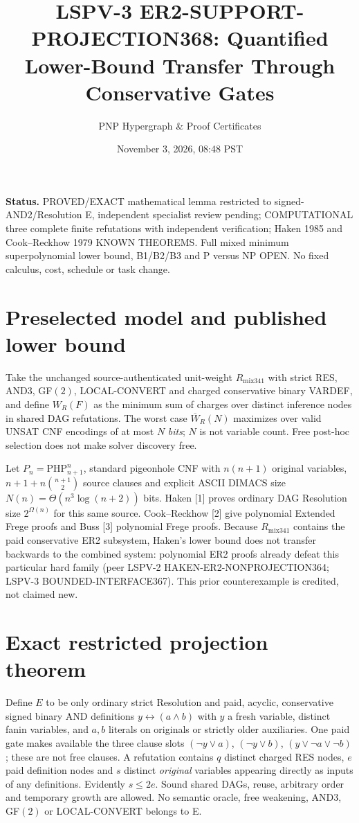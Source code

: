 \documentclass[11pt]{article}
\title{LSPV-3 ER2-SUPPORT-PROJECTION368: Quantified Lower-Bound Transfer Through Conservative Gates}
\author{PNP Hypergraph \& Proof Certificates}
\date{November 3, 2026, 08:48 PST}
\begin{document}
\maketitle
\noindent\textbf{Status.} PROVED/EXACT mathematical lemma restricted to signed-AND2/Resolution E, independent specialist review pending; COMPUTATIONAL three complete finite refutations with independent verification; Haken 1985 and Cook--Reckhow 1979 KNOWN THEOREMS. Full mixed minimum superpolynomial lower bound, B1/B2/B3 and P versus NP OPEN. No fixed calculus, cost, schedule or task change.

\section*{Preselected model and published lower bound}
Take the unchanged source-authenticated unit-weight $R_{\mathrm{mix341}}$ with strict RES, AND3, GF$(2)$, LOCAL-CONVERT and charged conservative binary VARDEF, and define $W_R(F)$ as the minimum sum of charges over distinct inference nodes in shared DAG refutations. The worst case $\overline W_R(N)$ maximizes over valid UNSAT CNF encodings of at most $N$ \emph{bits}; $N$ is not variable count. Free post-hoc selection does not make solver discovery free.

Let $P_n=\mathrm{PHP}_{n+1}^n$, standard pigeonhole CNF with $n(n+1)$ original variables, $n+1+n\binom{n+1}{2}$ source clauses and explicit ASCII DIMACS size $N(n)=\Theta(n^3\log(n+2))$ bits. Haken [1] proves ordinary DAG Resolution size $2^{\Omega(n)}$ for this same source. Cook--Reckhow [2] give polynomial Extended Frege proofs and Buss [3] polynomial Frege proofs. Because $R_{\mathrm{mix341}}$ contains the paid conservative ER2 subsystem, Haken's lower bound does not transfer backwards to the combined system: polynomial ER2 proofs already defeat this particular hard family (peer LSPV-2 HAKEN-ER2-NONPROJECTION364; LSPV-3 BOUNDED-INTERFACE367). This prior counterexample is credited, not claimed new.

\section*{Exact restricted projection theorem}
Define $E$ to be only ordinary strict Resolution and paid, acyclic, conservative signed binary AND definitions $y\leftrightarrow(a\land b)$ with $y$ a fresh variable, distinct fanin variables, and $a,b$ literals on originals or strictly older auxiliaries. One paid gate makes available the three clause slots $(\neg y\vee a)$, $(\neg y\vee b)$, $(y\vee\neg a\vee\neg b)$; these are not free clauses. A refutation contains $q$ distinct charged RES nodes, $e$ paid definition nodes and $s$ distinct \emph{original} variables appearing directly as inputs of any definitions. Evidently $s\le 2e$. Sound shared DAGs, reuse, arbitrary order and temporary growth are allowed. No semantic oracle, free weakening, AND3, GF$(2)$ or LOCAL-CONVERT belongs to E.
\end{document}
